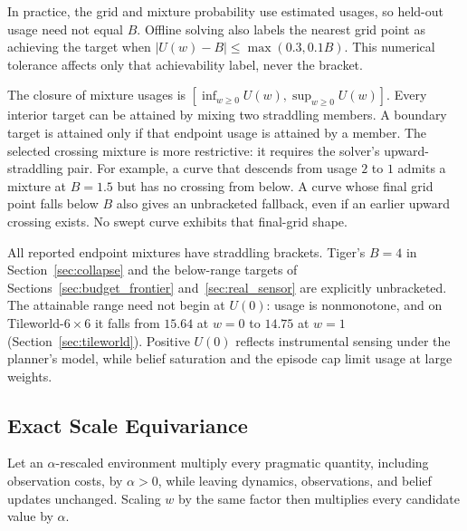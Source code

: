 \documentclass[manuscript, screen, review]{jair}
\begin{document}
In practice, the grid and mixture probability use estimated usages, so held-out usage need not equal $B$. Offline solving also labels the nearest grid point as achieving the target when $|U(w)-B|\le\max(0.3,0.1B)$. This numerical tolerance affects only that achievability label, never the bracket.

The closure of mixture usages is $[\inf_{w\ge0}U(w),\sup_{w\ge0}U(w)]$. Every interior target can be attained by mixing two straddling members. A boundary target is attained only if that endpoint usage is attained by a member. The selected crossing mixture is more restrictive: it requires the solver's upward-straddling pair. For example, a curve that descends from usage $2$ to $1$ admits a mixture at $B=1.5$ but has no crossing from below. A curve whose final grid point falls below $B$ also gives an unbracketed fallback, even if an earlier upward crossing exists. No swept curve exhibits that final-grid shape.

All reported endpoint mixtures have straddling brackets. Tiger's $B=4$ in Section~\ref{sec:collapse} and the below-range targets of Sections~\ref{sec:budget_frontier} and~\ref{sec:real_sensor} are explicitly unbracketed. The attainable range need not begin at $U(0)$: usage is nonmonotone, and on Tileworld-$6{\times}6$ it falls from $15.64$ at $w=0$ to $14.75$ at $w=1$ (Section~\ref{sec:tileworld}). Positive $U(0)$ reflects instrumental sensing under the planner's model, while belief saturation and the episode cap limit usage at large weights.

\subsection{Exact Scale Equivariance}
\label{sec:pi1}

Let an $\alpha$-rescaled environment multiply every pragmatic quantity, including observation costs, by $\alpha>0$, while leaving dynamics, observations, and belief updates unchanged. Scaling $w$ by the same factor then multiplies every candidate value by $\alpha$.
\end{document}
